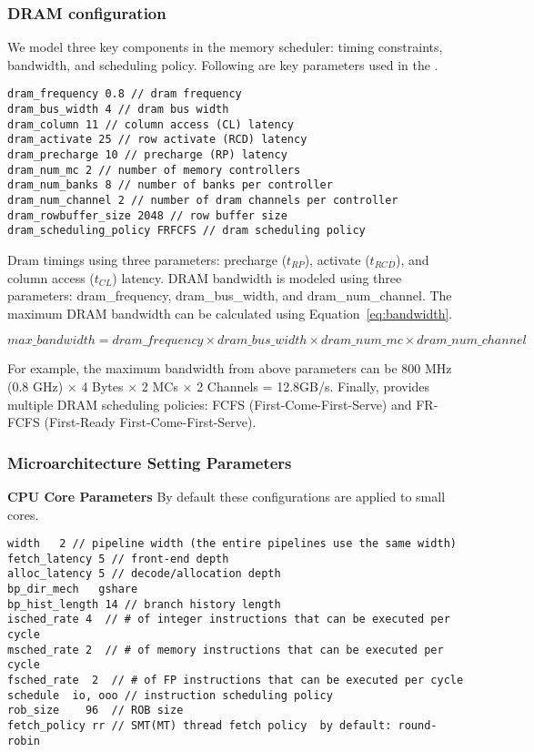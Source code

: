 \subsubsection{DRAM configuration}
\label{sec:param-dram}

We model three key components in the memory scheduler: timing
constraints, bandwidth, and scheduling policy. Following are key
parameters used in the \SIM.


\smallskip
\begin{lstlisting}
dram_frequency 0.8 // dram frequency
dram_bus_width 4 // dram bus width
dram_column 11 // column access (CL) latency
dram_activate 25 // row activate (RCD) latency
dram_precharge 10 // precharge (RP) latency
dram_num_mc 2 // number of memory controllers
dram_num_banks 8 // number of banks per controller
dram_num_channel 2 // number of dram channels per controller
dram_rowbuffer_size 2048 // row buffer size
dram_scheduling_policy FRFCFS // dram scheduling policy
\end{lstlisting}
\smallskip

Dram timings using three parameters: precharge ($t_{RP}$), activate
($t_{RCD}$), and column access ($t_{CL}$) latency. DRAM bandwidth is
modeled using three
parameters: \textsf{dram\_frequency}, \textsf{dram\_bus\_width},
and \textsf{dram\_num\_channel}. The maximum DRAM bandwidth can be
calculated using Equation~\ref{eq:bandwidth}.

\begin{equation}
\label{eq:bandwidth}
max\_bandwidth = dram\_frequency \times dram\_bus\_width \times dram\_num\_mc \times dram\_num\_channel 
\end{equation}

For example, the maximum bandwidth from above parameters can
be \textsf{800 MHz (0.8 GHz)} $\times$ \textsf{4 Bytes}
$\times$ \textsf{2 MCs} $\times$ \textsf{2 Channels}
= \textsf{12.8GB/s}. Finally, \SIM provides multiple DRAM scheduling
policies: FCFS (First-Come-First-Serve) and FR-FCFS (First-Ready
First-Come-First-Serve).


\subsubsection{Microarchitecture Setting Parameters}

\noindent 
{\bf CPU Core Parameters} 
By default these configurations are applied to small cores. 

\smallskip
\begin{lstlisting}
width   2 // pipeline width (the entire pipelines use the same width) 
fetch_latency 5 // front-end depth 
alloc_latency 5 // decode/allocation depth  
bp_dir_mech   gshare 
bp_hist_length 14 // branch history length 
isched_rate 4  // # of integer instructions that can be executed per cycle 
msched_rate 2  // # of memory instructions that can be executed per cycle 
fsched_rate  2  // # of FP instructions that can be executed per cycle 
schedule  io, ooo // instruction scheduling policy 
rob_size    96  // ROB size 
fetch_policy rr // SMT(MT) thread fetch policy  by default: round-robin 
\end{lstlisting}
\smallskip

